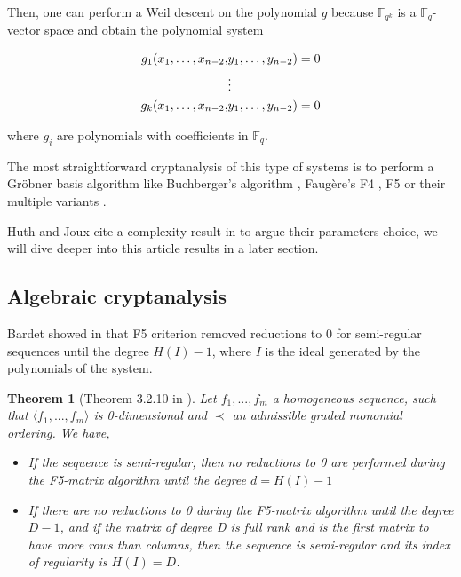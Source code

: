 \documentclass[english]{article}
\newtheorem{theorem}{Theorem}[section]
\begin{document}
		Then, one can perform a Weil descent on the polynomial $g$ because $\mathbb{F}_{q^k}$ is a $\mathbb{F}_q$-vector space and obtain the polynomial system
		
		
		\begin{align}
			g_1(x_1, \dots, x_{n-2},& y_1, \dots, y_{n-2}) = 0 \notag \\
			&\vdots \notag \\
			g_k(x_1, \dots, x_{n-2},& y_1, \dots, y_{n-2}) = 0 \notag
		\end{align}
		
		where $g_i$ are polynomials with coefficients in $\mathbb{F}_q$.
		
		The most straightforward cryptanalysis of this type of systems is to perform a Gröbner basis algorithm like Buchberger's algorithm \cite{Buc}, Faugère's F4 \cite{F99}, F5 \cite{F02} or their multiple variants \cite{EF19}.
		
		Huth and Joux cite a complexity result in \cite{FSS11} to argue their parameters choice, we will dive deeper into this article  results in a later section.
		
		\subsection{Algebraic cryptanalysis}
		
		Bardet showed in \cite{Bardet04} that F5 criterion removed reductions to 0 for semi-regular sequences until the degree $H(I) - 1$, where $I$ is the ideal generated by the polynomials of the system.
		
		\begin{theorem}[Theorem 3.2.10 in \cite{Bardet04}]
			Let $f_1,...,f_m$ a homogeneous sequence, such that $\langle f_1,...,f_m \rangle$ is 0-dimensional and
			$\prec$ an admissible graded monomial ordering. We have,
			\begin{itemize}
				\item[-] If the sequence is semi-regular, then no reductions to 0 are performed during the F5-matrix algorithm until the degree $d = H(I) - 1$
				\item[-] If there are no reductions to 0 during the F5-matrix algorithm until the degree $D - 1$, and if the matrix of degree D is full rank and is the first matrix to have more rows than columns, then the sequence is semi-regular and its index of regularity is $H(I) = D$.
			\end{itemize}
		\end{theorem}
		
\end{document}
